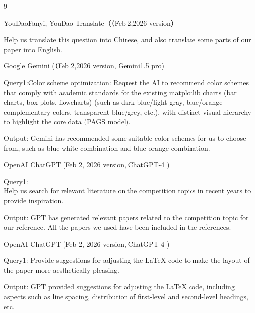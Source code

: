 \AImatter
\begin{ReportAiUse}{9}



YouDaoFanyi, YouDao Translate（（Feb 2,2026 version）


Help us translate this question into Chinese, and also translate some parts of our paper into English.







Google Gemini (（Feb 2,2026 version, Gemini1.5 pro)

Query1:Color scheme optimization: Request the AI to recommend color schemes that comply with academic standards for the existing matplotlib charts (bar charts, box plots, flowcharts) (such as dark blue/light gray, blue/orange complementary colors, transparent blue/grey, etc.), with distinct visual hierarchy to highlight the core data (PAGS model).


Output:    Gemini has recommended some suitable color schemes for us to choose from, such as blue-white combination and blue-orange combination.






OpenAI ChatGPT (Feb 2, 2026 version, ChatGPT-4 )


Query1: \\Help us search for relevant literature on the competition topics in recent years to provide inspiration.


Output:   GPT has generated relevant papers related to the competition topic for our reference. All the papers we used have been included in the references.





OpenAI ChatGPT (Feb 2, 2026 version, ChatGPT-4 )


Query1: Provide suggestions for adjusting the LaTeX code to make the layout of the paper more aesthetically pleasing.


Output:  GPT provided suggestions for adjusting the LaTeX code, including aspects such as line spacing, distribution of first-level and second-level headings, etc.   









\end{ReportAiUse}